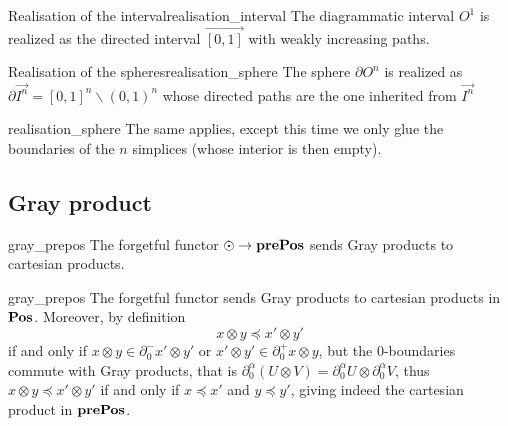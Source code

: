 \begin{ccor}{Realisation of the interval}{realisation_interval}
    The diagrammatic interval \( O^1 \) is realized as the directed interval \( \vec{[0, 1]} \) with weakly increasing paths.
\end{ccor}

\begin{ccor}{Realisation of the spheres}{realisation_sphere}
    The sphere \( \partial O^n \) is realized as \( \partial \vec {I^n} = [0, 1]^n \backslash (0, 1)^n \) whose directed paths are the one inherited from \( \vec {I^n} \)
\end{ccor}
\begin{corproof}{realisation_sphere}
    The same applies, except this time we only glue the boundaries of the \( n \) simplices (whose interior is then empty).
\end{corproof}

\subsection{Gray product}

\begin{clem}{}{gray_prepos}
    The forgetful functor \( \eye \to \prePos \) sends Gray products to cartesian products.
\end{clem}
\begin{lemproof}{gray_prepos}
    The forgetful functor sends Gray products to cartesian products in \( \mathbf{Pos} \). Moreover, by definition
    \begin{equation*}
        x \otimes y \preceq x' \otimes y'
    \end{equation*} 
    if and only if \( x \otimes y \in \partial^-_0 x' \otimes y' \) or \( x' \otimes y' \in \partial^+_0 x \otimes y \), but the 0-boundaries commute with Gray products, that is \( \partial^\alpha_0 (U \otimes V) = \partial^\alpha_0 U \otimes \partial^\alpha_0 V \), thus \(  x \otimes y \preceq x' \otimes y' \) if and only if \( x \preceq x' \) and \( y \preceq y' \), giving indeed the cartesian product in \( \mathbf{prePos} \).
\end{lemproof}

